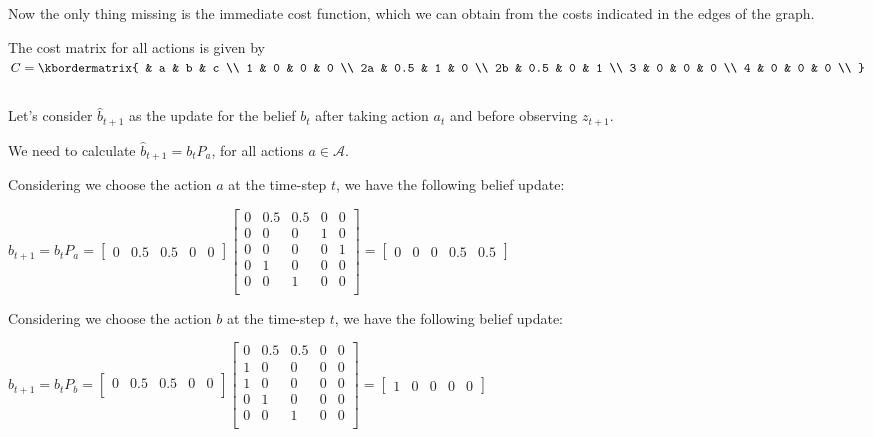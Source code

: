 \documentclass{article}
\begin{document}
Now the only thing missing is the immediate cost function, which we can obtain from
the costs indicated in the edges of the graph.

\medskip

The cost matrix for all actions is given by 
$
  C = \kbordermatrix{
    & a & b & c \\
    1 & 0 & 0 & 0 \\
    2a & 0.5 & 1 & 0 \\
    2b & 0.5 & 0 & 1 \\
    3 & 0 & 0 & 0 \\
    4 & 0 & 0 & 0 \\
  }
$

\medskip

\subsection{}

Let's consider $\hat{b}_{t+1}$ as the update for the belief $b_t$ after taking action $a_t$ and before observing $z_{t+1}$. 

We need to calculate $\hat{b}_{t+1} = b_t P_a$, for all actions $a \in \mathcal{A}$.

\bigskip

Considering we choose the action $a$ at the time-step $t$, we have the following belief update:

\medskip

$
  \hat{b}_{t+1} = b_t P_a = 
  \begin{bmatrix}
    0 & 0.5 & 0.5 & 0 & 0
  \end{bmatrix}
  \begin{bmatrix}
    0 & 0.5 & 0.5 & 0 & 0 \\
    0 & 0 & 0 & 1 & 0 \\
    0 & 0 & 0 & 0 & 1 \\
    0 & 1 & 0 & 0 & 0 \\
    0 & 0 & 1 & 0 & 0 \\
  \end{bmatrix} = \begin{bmatrix}
    0 & 0 & 0 & 0.5 & 0.5
  \end{bmatrix}
$

\bigskip

Considering we choose the action $b$ at the time-step $t$, we have the following belief update:

\medskip

$
  \hat{b}_{t+1} = b_t P_b = 
  \begin{bmatrix}
    0 & 0.5 & 0.5 & 0 & 0 \\
  \end{bmatrix}
  \begin{bmatrix}
    0 & 0.5 & 0.5 & 0 & 0 \\
    1 & 0 & 0 & 0 & 0 \\
    1 & 0 & 0 & 0 & 0 \\
    0 & 1 & 0 & 0 & 0 \\
    0 & 0 & 1 & 0 & 0 \\
  \end{bmatrix} = \begin{bmatrix}
    1 & 0 & 0 & 0 & 0
  \end{bmatrix}
$
\end{document}
